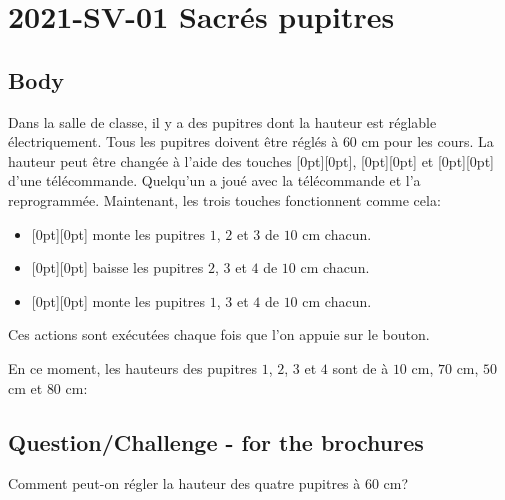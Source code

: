 \documentclass[a4paper,11pt]{report}
\newcommand{\taskGraphicsFolder}{..}
\begin{document}
\section*{\centering{} 2021-SV-01 Sacrés pupitres}


\subsection*{Body}

Dans la salle de classe, il y a des pupitres dont la hauteur est réglable électriquement. Tous les pupitres doivent être réglés à $60$ cm pour les cours. La hauteur peut être changée à l’aide des touches \raisebox{-0.5ex}[0pt][0pt]{}, \raisebox{-0.5ex}[0pt][0pt]{} et \raisebox{-0.5ex}[0pt][0pt]{} d’une télécommande. Quelqu’un a joué avec la télécommande et l’a reprogrammée. Maintenant, les trois touches fonctionnent comme cela:

\begin{itemize}
  \item \raisebox{-0.5ex}[0pt][0pt]{} monte les pupitres $1$, $2$ et $3$ de $10$ cm chacun.
  \item \raisebox{-0.5ex}[0pt][0pt]{} baisse les pupitres $2$, $3$ et $4$ de $10$ cm chacun.
  \item \raisebox{-0.5ex}[0pt][0pt]{} monte les pupitres $1$, $3$ et $4$ de $10$ cm chacun.
\end{itemize}

Ces actions sont exécutées chaque fois que l’on appuie sur le bouton.

En ce moment, les hauteurs des pupitres $1$, $2$, $3$ et $4$ sont de à $10$ cm, $70$ cm, $50$ cm et $80$ cm:

{\centering%
\par}

{\em


\subsection*{Question/Challenge - for the brochures}

Comment peut-on régler la hauteur des quatre pupitres à 60 cm?

}
\end{document}

